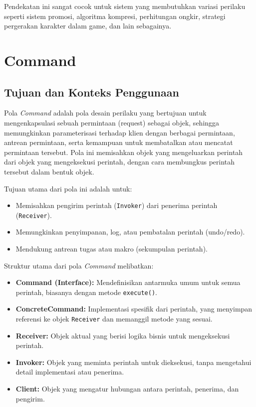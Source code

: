 Pendekatan ini sangat cocok untuk sistem yang membutuhkan variasi perilaku seperti sistem promosi, algoritma kompresi, perhitungan ongkir, strategi pergerakan karakter dalam game, dan lain sebagainya.


\section{Command}

\subsection{Tujuan dan Konteks Penggunaan}

Pola \textit{Command} adalah pola desain perilaku yang bertujuan untuk mengenkapsulasi sebuah permintaan (request) sebagai objek, sehingga memungkinkan parameterisasi terhadap klien dengan berbagai permintaan, antrean permintaan, serta kemampuan untuk membatalkan atau mencatat permintaan tersebut. Pola ini memisahkan objek yang mengeluarkan perintah dari objek yang mengeksekusi perintah, dengan cara membungkus perintah tersebut dalam bentuk objek.

Tujuan utama dari pola ini adalah untuk:
\begin{itemize}
	\item Memisahkan pengirim perintah (\texttt{Invoker}) dari penerima perintah (\texttt{Receiver}).
	\item Memungkinkan penyimpanan, log, atau pembatalan perintah (undo/redo).
	\item Mendukung antrean tugas atau makro (sekumpulan perintah).
\end{itemize}

Struktur utama dari pola \textit{Command} melibatkan:
\begin{itemize}
	\item \textbf{Command (Interface):} Mendefinisikan antarmuka umum untuk semua perintah, biasanya dengan metode \texttt{execute()}.
	\item \textbf{ConcreteCommand:} Implementasi spesifik dari perintah, yang menyimpan referensi ke objek \texttt{Receiver} dan memanggil metode yang sesuai.
	\item \textbf{Receiver:} Objek aktual yang berisi logika bisnis untuk mengeksekusi perintah.
	\item \textbf{Invoker:} Objek yang meminta perintah untuk dieksekusi, tanpa mengetahui detail implementasi atau penerima.
	\item \textbf{Client:} Objek yang mengatur hubungan antara perintah, penerima, dan pengirim.
\end{itemize}

